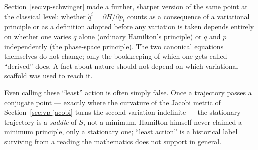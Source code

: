 Section~\ref{sec:vp-schwinger} made a further, sharper version of the
    same point at the classical level: whether $\dot q^i=\partial H/\partial
    p_i$ counts as a consequence of a variational principle or as a definition
    adopted before any variation is taken depends entirely on whether one
    varies $q$ alone (ordinary Hamilton's principle) or $q$ and $p$
    independently (the phase-space principle). The two canonical equations
    themselves do not change; only the bookkeeping of which one gets called
    ``derived'' does. A fact about nature should not depend on which
    variational scaffold was used to reach it.

Even calling these ``least'' action is often simply false. Once a trajectory
    passes a conjugate point --- exactly where the curvature of the Jacobi
    metric of Section~\ref{sec:vp-jacobi} turns the second variation indefinite
    --- the stationary trajectory is a \emph{saddle} of $S$, not a minimum.
    Hamilton himself never claimed a minimum principle, only a stationary one;
    ``least action'' is a historical label surviving from a reading the
    mathematics does not support in general.

